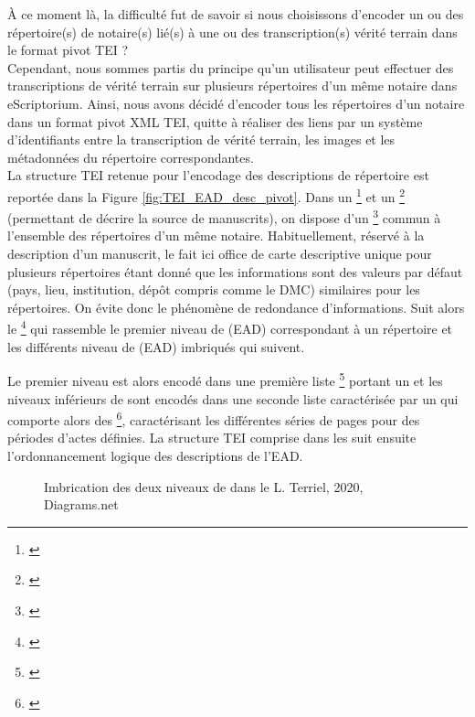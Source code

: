 À ce moment là, la difficulté fut de savoir si nous choisissons d'encoder un ou des répertoire(s) de notaire(s) lié(s) à une ou des transcription(s) vérité terrain dans le format pivot TEI ?\\

Cependant, nous sommes partis du principe qu'un utilisateur peut effectuer des transcriptions de vérité terrain sur plusieurs répertoires d'un même notaire dans eScriptorium. Ainsi, nous avons décidé d'encoder tous les répertoires d'un notaire dans un format pivot XML TEI, quitte à réaliser des liens par un système d'identifiants entre la transcription de vérité terrain, les images et les métadonnées du répertoire correspondantes.\\

La structure TEI retenue pour l'encodage des descriptions de répertoire est reportée dans la Figure \ref{fig:TEI_EAD_desc_pivot}. Dans un \footnote{\cite{tei_tei_nodate-6}} et un \footnote{\cite{tei_tei_nodate-4}} (permettant de décrire la source de manuscrits), on dispose d'un \footnote{\cite{tei_tei_nodate-22}} commun à l'ensemble des répertoires d'un même notaire. Habituellement, réservé à la description d'un manuscrit, le  fait ici office de carte descriptive unique pour plusieurs répertoires étant donné que les informations sont des valeurs par défaut (pays, lieu, institution, dépôt compris comme le DMC) similaires pour les répertoires. On évite donc le phénomène de redondance d'informations. Suit alors le \footnote{\cite{tei_tei_nodate-5}} qui rassemble le premier niveau de  (EAD) correspondant à un répertoire et les différents niveau de  (EAD) imbriqués qui suivent. 

Le premier niveau est alors encodé dans une première liste \footnote{\cite{tei_tei_nodate-21}} portant un   et les niveaux inférieurs de  sont encodés dans une seconde liste  caractérisée par un   qui comporte alors des \footnote{\cite{tei_tei_nodate-20}}, caractérisant les différentes séries de pages pour des périodes d'actes définies. La structure TEI comprise dans les  suit ensuite l'ordonnancement logique des descriptions de l'EAD.

\begin{wrapfigure}[20]{l}{11cm}
    \centering
    \centerline{}
    \caption{Imbrication des deux niveaux de  dans le  \textcopyright L. Terriel, 2020, Diagrams.net}
    \label{fig:metaliste}
\end{wrapfigure}

